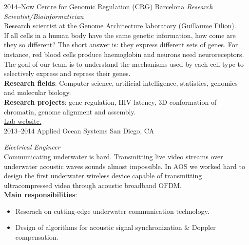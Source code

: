 \documentclass[]{friggeri-cv} %
\begin{document}
\begin{entrylist}


\entry
{2014--Now}
{Centre for Genomic Regulation (CRG)}
{Barcelona}
{%
\emph{Research Scientist/Bioinformatician} \\
Research scientist at the Genome Architecture laboratory
(\href{http://blog.thegrandlocus.com/}{Guillaume Filion}). \\
If all cells in a human body have the same genetic information, how come are
they so different? The short answer is:  they express different sets of genes.
For instance, red blood cells produce haemoglobin and neurons need neuroreceptors.
The goal of our team is to understand the mechanisms used by each cell type to
selectively express and repress their genes.\\
{\bf Research fields}: Computer science, artificial intelligence, statistics,
genomics and molecular biology. \\
{\bf Research projects}: gene regulation, HIV latency, 3D conformation of
chromatin, genome alignment and assembly.\\
\href{http://www.genomearchitecture.com}{{\FA \faExternalLink} Lab website.}
}\\


\entry
{2013--2014}
{Applied Ocean Systems}
{San Diego, CA}
{%
\emph{Electrical Engineer} \\
Communicating underwater is hard. Transmitting live video streams over underwater
acoustic waves sounds almost impossible. In AOS we worked hard to design the
first underwater wireless device capable of transmitting ultracompressed video
through acoustic broadband OFDM. \\
{\bf Main responsibilities}:
  \begin{itemize}
    \item Reserach on cutting-edge underwater communication technology.
    \item Design of algorithms for acoustic signal synchronization \& Doppler compensation.
  \end{itemize}
}\\



\end{entrylist}
\end{document}
